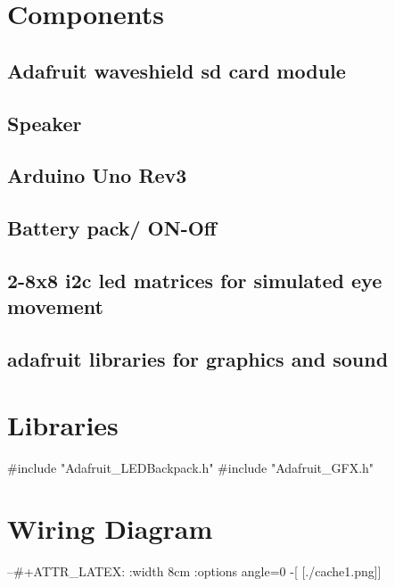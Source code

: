 \documentclass[a4paper,6pt]{article}
\begin{document}
\section{Components}
\label{sec-2}
\subsection{Adafruit waveshield sd card module}
\label{sec-2-1}
\subsection{Speaker}
\label{sec-2-2}
\subsection{Arduino Uno Rev3}
\label{sec-2-3}
\subsection{Battery pack/ ON-Off}
\label{sec-2-4}
\subsection{2-8x8 i2c led matrices for simulated eye movement}
\label{sec-2-5}
\subsection{adafruit libraries for graphics and sound}
\label{sec-2-6}
\section{Libraries}
\label{sec-3}
\#include "Adafruit\_LEDBackpack.h"
\#include "Adafruit\_GFX.h"
\section{Wiring Diagram}
\label{sec-4}
--\#+ATTR\_LATEX: :width 8cm :options angle=0
-[ [./cache1.png]]
\end{document}
